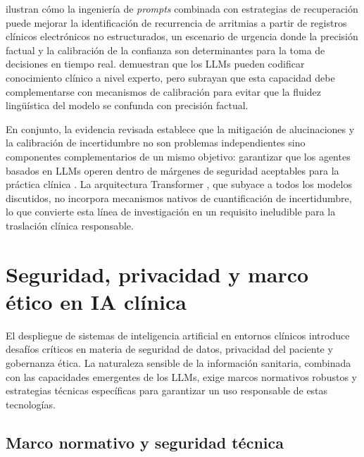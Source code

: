 \textcite{Feng2025arrhythmia} ilustran cómo la ingeniería de \emph{prompts} combinada con estrategias de recuperación puede mejorar la identificación de recurrencia de arritmias a partir de registros clínicos electrónicos no estructurados, un escenario de urgencia donde la precisión factual y la calibración de la confianza son determinantes para la toma de decisiones en tiempo real. \textcite{singhal2023} demuestran que los \ac{LLM}s pueden codificar conocimiento clínico a nivel experto, pero subrayan que esta capacidad debe complementarse con mecanismos de calibración para evitar que la fluidez lingüística del modelo se confunda con precisión factual.

En conjunto, la evidencia revisada establece que la mitigación de alucinaciones y la calibración de incertidumbre no son problemas independientes sino componentes complementarios de un mismo objetivo: garantizar que los agentes basados en \ac{LLM}s operen dentro de márgenes de seguridad aceptables para la práctica clínica \parencite{kim2025hallucination,Atf2025uncertainty,hossain2025}. La arquitectura Transformer \parencite{vaswani2017attention}, que subyace a todos los modelos discutidos, no incorpora mecanismos nativos de cuantificación de incertidumbre, lo que convierte esta línea de investigación en un requisito ineludible para la traslación clínica responsable.

\section{Seguridad, privacidad y marco ético en \acs{IA} clínica}
\label{sec:seguridad_privacidad}

El despliegue de sistemas de inteligencia artificial en entornos clínicos introduce desafíos críticos en materia de seguridad de datos, privacidad del paciente y gobernanza ética. La naturaleza sensible de la información sanitaria, combinada con las capacidades emergentes de los \ac{LLM}s, exige marcos normativos robustos y estrategias técnicas específicas para garantizar un uso responsable de estas tecnologías.

\subsection{Marco normativo y seguridad técnica}
\label{subsec:marco_normativo}


